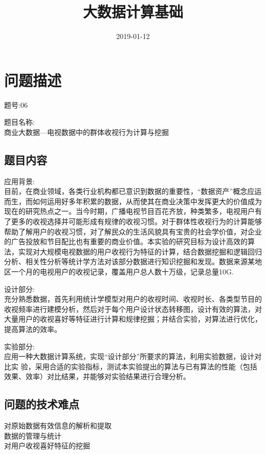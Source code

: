 \documentclass{hitreport}
\title{大数据计算基础}
\date{2019-01-12}
\begin{document}
\makecover


\section{问题描述}
题号:06\par
题目名称: \\
商业大数据—电视数据中的群体收视行为计算与挖掘\par
\subsection{题目内容}
应用背景:\\
目前，在商业领域，各类行业机构都已意识到数据的重要性，“数据资产”概念应运而生，而如何运用好多年积累的数据，从而使其在商业决策中发挥更大的价值成为现在的研究热点之一。当今时期，广播电视节目百花齐放，种类繁多，电视用户有了更多的收视选择并可能形成有规律的收视习惯。对于群体性收视行为的计算能够帮助了解用户的收视习惯，对了解民众的生活风貌具有宝贵的社会学价值，对企业的广告投放和节目配比也有重要的商业价值。本实验的研究目标为设计高效的算法，实现对大规模电视数据的用户收视行为特征的计算，结合数据挖掘和逻辑回归分析、相关性分析等统计学方法对该部分数据进行知识挖掘和发现。数据来源某地区一个月的电视用户的收视记录，覆盖用户总人数十万级，记录总量10G.\par
设计部分:\\
充分熟悉数据，首先利用统计学模型对用户的收视时间、收视时长、各类型节目的收视频率进行建模分析，然后对于每个用户设计状态转移图，设计有效的算法，对大量用户的收视喜好等特征进行计算和规律挖掘；并结合实验，对算法进行优化，提高算法的效率。\par
实验部分:\\
应用一种大数据计算系统，实现“设计部分”所要求的算法，利用实验数据，设计对比实 验，采用合适的实验指标，测试本实验提出的算法与已有算法的性能（包括效果、效率）对比结果，并能够对实验结果进行合理分析。

\subsection{问题的技术难点}
\begin{flushleft}
  对原始数据有效信息的解析和提取\\
  数据的管理与统计\\
  对用户收视喜好特征的挖掘
\end{flushleft}
\end{document}
